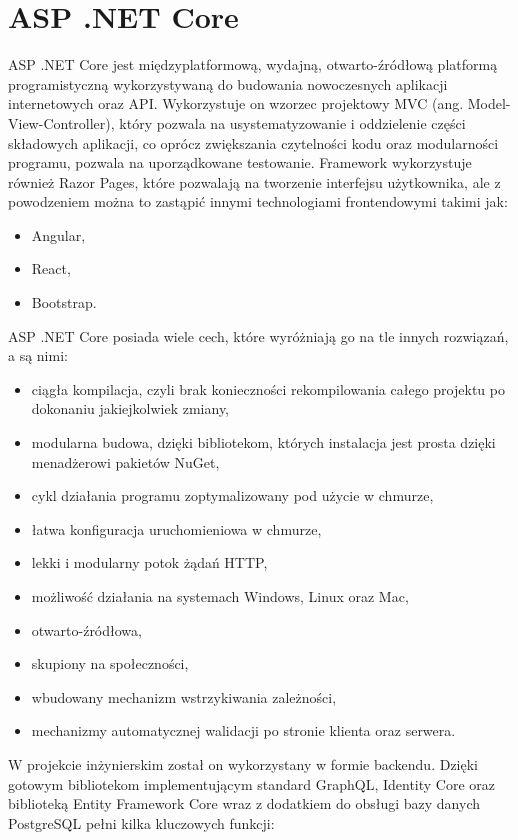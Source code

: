 \section{ASP .NET Core}
ASP .NET Core jest międzyplatformową, wydajną, otwarto-źródłową platformą programistyczną wykorzystywaną do budowania nowoczesnych aplikacji internetowych oraz API. Wykorzystuje on wzorzec projektowy MVC (ang. Model-View-Controller), który pozwala na usystematyzowanie i oddzielenie części składowych aplikacji, co oprócz zwiększania czytelności kodu oraz modularności programu, pozwala na uporządkowane testowanie. Framework wykorzystuje również Razor Pages, które pozwalają na tworzenie interfejsu użytkownika, ale z powodzeniem można to zastąpić innymi technologiami frontendowymi takimi jak:
\begin{itemize}
    \item Angular,
    \item React,
    \item Bootstrap.
\end{itemize}
ASP .NET Core posiada wiele cech, które wyróżniają go na tle innych rozwiązań, a są nimi:
\begin{itemize}
    \item ciągła kompilacja, czyli brak konieczności rekompilowania całego projektu po dokonaniu jakiejkolwiek zmiany,
    \item modularna budowa, dzięki bibliotekom, których instalacja jest prosta dzięki menadżerowi pakietów NuGet,
    \item cykl działania programu zoptymalizowany pod użycie w chmurze,
    \item łatwa konfiguracja uruchomieniowa w chmurze,
    \item lekki i modularny potok żądań HTTP,
    \item możliwość działania na systemach Windows, Linux oraz Mac,
    \item otwarto-źródłowa,
    \item skupiony na społeczności,
    \item wbudowany mechanizm wstrzykiwania zależności,
    \item mechanizmy automatycznej walidacji po stronie klienta oraz serwera.
\end{itemize}
W projekcie inżynierskim został on wykorzystany w formie backendu. Dzięki gotowym bibliotekom implementującym standard GraphQL, Identity Core oraz biblioteką Entity Framework Core wraz z dodatkiem do obsługi bazy danych PostgreSQL pełni kilka kluczowych funkcji:
